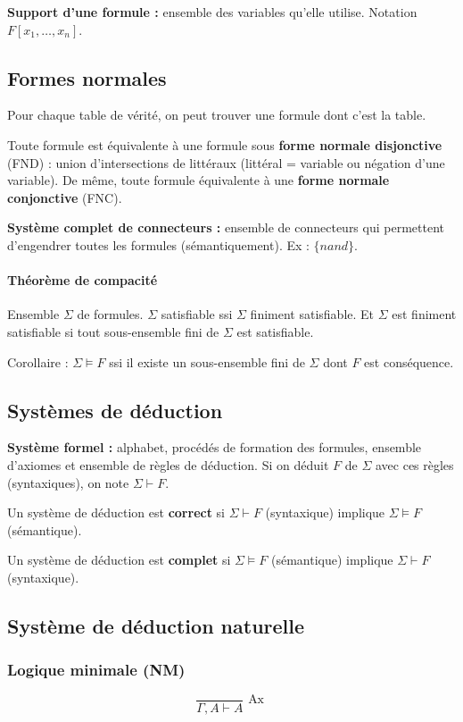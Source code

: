 \documentclass[french]{article}
\begin{document}
\textbf{Support d'une formule :} ensemble des variables qu'elle utilise. Notation $F[x_1, \dots, x_n]$.


\subsection{Formes normales}
Pour chaque table de vérité, on peut trouver une formule dont c'est la table.

Toute formule est équivalente à une formule sous \textbf{forme normale disjonctive} (FND) : union d'intersections de littéraux (littéral = variable ou négation d'une variable). De même, toute formule équivalente à une \textbf{forme normale conjonctive} (FNC).

\textbf{Système complet de connecteurs :} ensemble de connecteurs qui permettent d'engendrer toutes les formules (sémantiquement). Ex : $\{nand\}$.

\paragraph{Théorème de compacité}
Ensemble $\Sigma$ de formules. $\Sigma$ satisfiable ssi $\Sigma$ finiment satisfiable. Et $\Sigma$ est finiment satisfiable si tout sous-ensemble fini de $\Sigma$ est satisfiable.

Corollaire : $\Sigma\models F$ ssi il existe un sous-ensemble fini de $\Sigma$ dont $F$ est conséquence.

\subsection{Systèmes de déduction}
\textbf{Système formel :} alphabet, procédés de formation des formules, ensemble d'axiomes et ensemble de règles de déduction. Si on déduit $F$ de $\Sigma$ avec ces règles (syntaxiques), on note $\Sigma\vdash F$.

Un système de déduction est \textbf{correct} si $\Sigma\vdash F$ (syntaxique) implique $\Sigma\models F$ (sémantique).

Un système de déduction est \textbf{complet} si  $\Sigma\models F$ (sémantique) implique  $\Sigma\vdash F$ (syntaxique).

\subsection{Système de déduction naturelle}
\subsubsection{Logique minimale (NM)}
\[\dfrac{}{\Gamma,A\vdash A} \text{ Ax }\]
\end{document}
